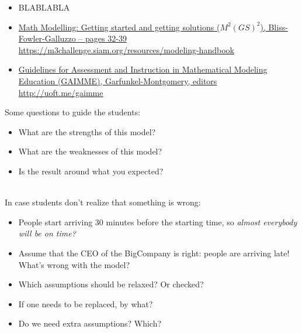 \begin{lesson}
\begin{itemize}
	\item BLABLABLA
\end{itemize}

\begin{annotation}
	\vspace{-20pt}
	\begin{goals}
	\end{goals}
	\begin{goals}
		\Goal{GAIMME}
		\qrcode{http://uoft.me/gaimme}
	\end{goals}
\end{annotation}
	
	\begin{itemize}
		\item \href{https://m3challenge.siam.org/resources/modeling-handbook}{Math Modelling: Getting started and getting solutions ($M^2(GS)^2$), Bliss-Fowler-Galluzzo -- pages 32-39} \\
		\hfill \url{https://m3challenge.siam.org/resources/modeling-handbook}
		
		\item \href{http://uoft.me/gaimme}{Guidelines for Assessment and Instruction in Mathematical Modeling Education (GAIMME), Garfunkel-Montgomery, editors}
		\hfill \url{http://uoft.me/gaimme}
	\end{itemize}
\end{lesson}





\begin{annotation}
\begin{notes}
	Some questions to guide the students:
	\begin{itemize}
		\item What are the strengths of this model?
		\item What are the weaknesses of this model?
		\item Is the result around what you expected?
	\end{itemize}	
	
	\hfill \\
	In case students don't realize that something is wrong:
	\begin{itemize}
		\item People start arriving 30 minutes before the starting time, so \emph{almost everybody will be on time?}
		\item Assume that the CEO of the BigCompany is right: people are arriving late! What's wrong with the model?
	
		\item Which assumptions should be relaxed? Or checked?
		\item If one needs to be replaced, by what?
		\item Do we need extra assumptions? Which?
	\end{itemize}
\end{notes}
\end{annotation}
\question

